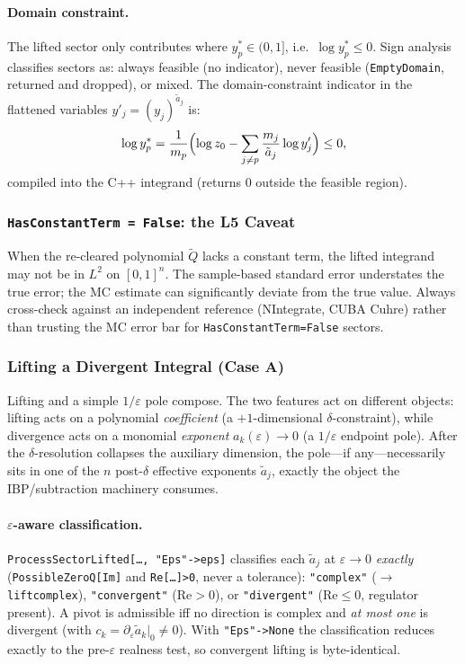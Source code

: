 \documentclass[11pt,a4paper]{article}
\begin{document}
\paragraph{Domain constraint.} The lifted sector only contributes where $y_p^*\in(0,1]$, i.e.\ $\log y_p^*\leq 0$. Sign analysis classifies sectors as: always feasible (no indicator), never feasible (\texttt{EmptyDomain}, returned and dropped), or mixed. The domain-constraint indicator in the flattened variables $y'_j=(y_j)^{\tilde{a}_j}$ is:
\begin{equation}
\log y_p^* = \frac{1}{m_p}\Bigl(\log z_0 - \sum_{j\neq p}\frac{m_j}{\tilde{a}_j}\log y'_j\Bigr) \leq 0,
\end{equation}
compiled into the C++ integrand (returns 0 outside the feasible region).

\subsubsection{\texttt{HasConstantTerm = False}: the L5 Caveat}

When the re-cleared polynomial $\tilde{Q}$ lacks a constant term, the lifted integrand may not be in $L^2$ on $[0,1]^n$. The sample-based standard error understates the true error; the MC estimate can significantly deviate from the true value. Always cross-check against an independent reference (NIntegrate, CUBA Cuhre) rather than trusting the MC error bar for \texttt{HasConstantTerm=False} sectors.

\subsubsection{Lifting a Divergent Integral (Case A)}\label{sec:liftdiv}

Lifting and a simple $1/\varepsilon$ pole compose. The two features act on different objects: lifting acts on a polynomial \emph{coefficient} (a $+1$-dimensional $\delta$-constraint), while divergence acts on a monomial \emph{exponent} $a_k(\varepsilon)\to 0$ (a $1/\varepsilon$ endpoint pole). After the $\delta$-resolution collapses the auxiliary dimension, the pole---if any---necessarily sits in one of the $n$ post-$\delta$ effective exponents $\tilde a_j$, exactly the object the IBP/subtraction machinery consumes.

\paragraph{$\varepsilon$-aware classification.} \texttt{ProcessSectorLifted[\ldots,\,"Eps"->eps]} classifies each $\tilde a_j$ at $\varepsilon\to 0$ \emph{exactly} (\texttt{PossibleZeroQ[Im]} and \texttt{Re[\ldots]>0}, never a tolerance): \texttt{"complex"} ($\to$\,\texttt{liftcomplex}), \texttt{"convergent"} ($\mathrm{Re}>0$), or \texttt{"divergent"} ($\mathrm{Re}\leq 0$, regulator present). A pivot is admissible iff no direction is complex and \emph{at most one} is divergent (with $c_k=\partial_\varepsilon\tilde a_k|_0\neq 0$). With \texttt{"Eps"->None} the classification reduces exactly to the pre-$\varepsilon$ realness test, so convergent lifting is byte-identical.
\end{document}

